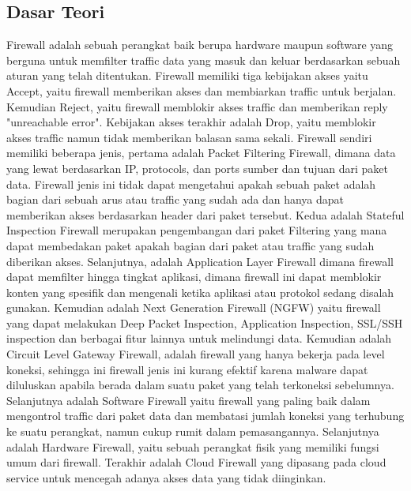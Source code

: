 \subsection{Dasar Teori}
Firewall adalah sebuah perangkat baik berupa hardware maupun software yang berguna untuk memfilter traffic data yang masuk dan keluar berdasarkan sebuah aturan yang telah ditentukan. Firewall memiliki tiga kebijakan akses yaitu Accept, yaitu firewall memberikan akses dan membiarkan traffic untuk berjalan. Kemudian Reject, yaitu firewall memblokir akses traffic dan memberikan reply "unreachable error". Kebijakan akses terakhir adalah Drop, yaitu memblokir akses traffic namun tidak memberikan balasan sama sekali. Firewall sendiri memiliki beberapa jenis, pertama adalah Packet Filtering Firewall, dimana data yang lewat berdasarkan IP, protocols, dan ports sumber dan tujuan dari paket data. Firewall jenis ini tidak dapat mengetahui apakah sebuah paket adalah bagian dari sebuah arus atau traffic yang sudah ada dan hanya dapat memberikan akses berdasarkan header dari paket tersebut. Kedua adalah Stateful Inspection Firewall merupakan pengembangan dari paket Filtering yang mana dapat membedakan paket apakah bagian dari paket atau traffic yang sudah diberikan akses. Selanjutnya, adalah Application Layer Firewall dimana firewall dapat memfilter hingga tingkat aplikasi, dimana firewall ini dapat memblokir konten yang spesifik dan mengenali ketika aplikasi atau protokol sedang disalah gunakan. Kemudian adalah Next Generation Firewall (NGFW) yaitu firewall yang dapat melakukan Deep Packet Inspection, Application Inspection, SSL/SSH inspection dan berbagai fitur lainnya untuk melindungi data. Kemudian adalah Circuit Level Gateway Firewall, adalah firewall yang hanya bekerja pada level koneksi, sehingga ini firewall jenis ini kurang efektif karena malware dapat diluluskan apabila berada dalam suatu paket yang telah terkoneksi sebelumnya. Selanjutnya adalah Software Firewall yaitu firewall yang paling baik dalam mengontrol traffic dari paket data dan membatasi jumlah koneksi yang terhubung ke suatu perangkat, namun cukup rumit dalam pemasangannya. Selanjutnya adalah Hardware Firewall, yaitu sebuah perangkat fisik yang memiliki fungsi umum dari firewall. Terakhir adalah Cloud Firewall yang dipasang pada cloud service untuk mencegah adanya akses data yang tidak diinginkan.\\

